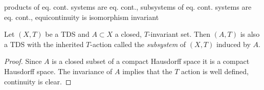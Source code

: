 \begin{proposition}
	products of eq. cont. systems are eq. cont., subsystems of eq. cont. systems are eq. cont., equicontinuity is isomorphism invariant
\end{proposition}


\begin{proposition}[Subsystem]
	Let $(X,T)$ be a TDS and $A \subset X$ a closed, $T$-invariant set.
	Then $(A,T)$ is also a TDS with the inherited $T$-action called the \emph{subsystem} of $(X,T)$ induced by $A$.
\end{proposition}
\begin{proof}
	Since $A$ is a closed subset of a compact Hausdorff space it is a compact Hausdorff space. The invariance of $A$ implies that the $T$ action is well defined, continuity is clear. 
\end{proof}